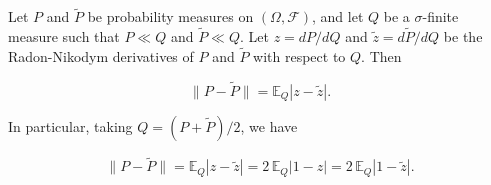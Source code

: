 Let $P$ and $\tilde{P}$ be probability measures on $(\Omega, \mathcal{F})$, and let $Q$ be a $\sigma$-finite measure such that $P \ll Q$ and $\tilde{P} \ll Q$. Let $z = dP/dQ$ and $\tilde{z} = d\tilde{P}/dQ$ be the Radon-Nikodym derivatives of $P$ and $\tilde{P}$ with respect to $Q$. Then

$$\|P - \tilde{P}\| = \mathbb{E}_Q|z - \tilde{z}|.$$

In particular, taking $Q = (P + \tilde{P})/2$, we have

$$\|P - \tilde{P}\| = \mathbb{E}_Q|z - \tilde{z}| = 2\,\mathbb{E}_Q|1 - z| = 2\,\mathbb{E}_Q|1 - \tilde{z}|.$$
